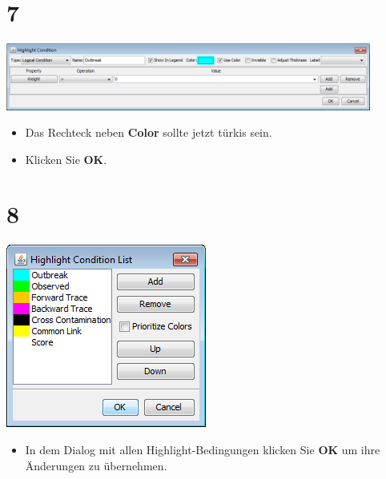 \documentclass{beamer}
\begin{document}
\section{7}
\begin{frame}
	\begin{center}
  		\includegraphics[width=0.9\textwidth]{7.png}
	\end{center}
	\begin{itemize}
		\item Das Rechteck neben \textbf{Color} sollte jetzt türkis sein.
		\item Klicken Sie \textbf{OK}.
	\end{itemize}
\end{frame}

\section{8}
\begin{frame}
	\begin{center}
  		\includegraphics[height=0.6\textheight]{8.png}
	\end{center}
	\begin{itemize}
		\item In dem Dialog mit allen Highlight-Bedingungen klicken Sie \textbf{OK} um ihre Änderungen zu übernehmen.
	\end{itemize}
\end{frame}
\end{document}
